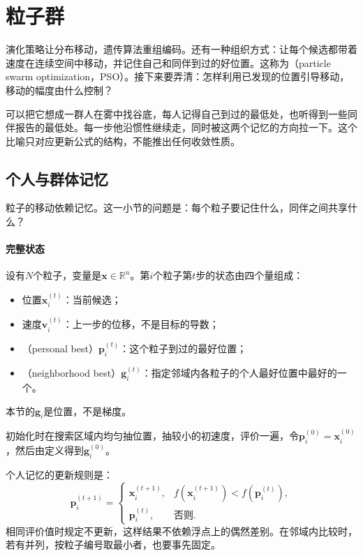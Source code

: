 \section{粒子群}
\label{sec:rs-pso}

演化策略让分布移动，遗传算法重组编码。还有一种组织方式：让每个候选都带着速度在连续空间中移动，并记住自己和同伴到过的好位置。这称为（particle swarm optimization，PSO）。接下来要弄清：怎样利用已发现的位置引导移动，移动的幅度由什么控制？

可以把它想成一群人在雾中找谷底，每人记得自己到过的最低处，也听得到一些同伴报告的最低处。每一步他沿惯性继续走，同时被这两个记忆的方向拉一下。这个比喻只对应更新公式的结构，不能推出任何收敛性质。

\subsection{个人与群体记忆}
\label{sec:rs-pso-memory}

粒子的移动依赖记忆。这一小节的问题是：每个粒子要记住什么，同伴之间共享什么？

\paragraph{完整状态}
设有$N$个粒子，变量是$\bm{x}\in\mathbb{R}^n$。第$i$个粒子第$t$步的状态由四个量组成：
\begin{itemize}
 \item 位置$\bm{x}_i^{(t)}$：当前候选；
 \item 速度$\bm{v}_i^{(t)}$：上一步的位移，不是目标的导数；
 \item {}（personal best）$\bm{p}_i^{(t)}$：这个粒子到过的最好位置；
 \item {}（neighborhood best）$\bm{g}_i^{(t)}$：指定邻域内各粒子的个人最好位置中最好的一个。
\end{itemize}
本节的$\bm{g}_i$是位置，不是梯度。

初始化时在搜索区域内均匀抽位置，抽较小的初速度，评价一遍，令$\bm{p}_i^{(0)}=\bm{x}_i^{(0)}$，然后由定义得到$\bm{g}_i^{(0)}$。

个人记忆的更新规则是：
\begin{equation}
 \bm{p}_i^{(t+1)}=
 \begin{cases}
  \bm{x}_i^{(t+1)},&f(\bm{x}_i^{(t+1)})<f(\bm{p}_i^{(t)}),\\
  \bm{p}_i^{(t)},&\text{否则}.
 \end{cases}
 \label{eq:rs-pso-pbest}
\end{equation}
相同评价值时规定不更新，这样结果不依赖浮点上的偶然差别。在邻域内比较时，若有并列，按粒子编号取最小者，也要事先固定。


